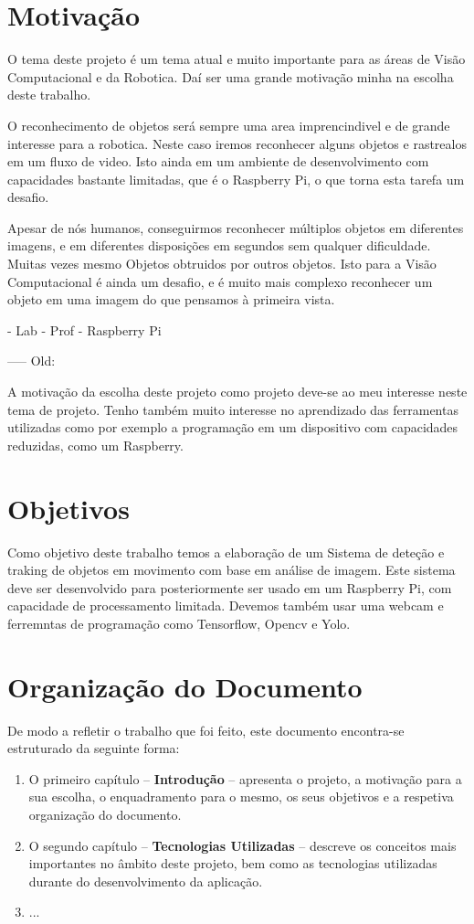 \section{Motivação}
\label{sec:mot}

O tema deste projeto é um tema atual e muito importante para as áreas de Visão Computacional e da Robotica. Daí ser uma grande motivação minha na escolha deste trabalho.

O reconhecimento de objetos será sempre uma area imprencindivel e de grande interesse para a robotica. Neste caso iremos reconhecer alguns objetos e rastrealos em um fluxo de video. 
Isto ainda em um ambiente de desenvolvimento com capacidades bastante limitadas, que é o Raspberry Pi, o que torna esta tarefa um desafio. 

Apesar de nós humanos, conseguirmos reconhecer múltiplos objetos em diferentes imagens, e em diferentes disposições em segundos sem qualquer dificuldade. Muitas vezes mesmo Objetos obtruidos por outros objetos. Isto para a Visão Computacional é ainda um desafio, e é muito mais complexo reconhecer um objeto em uma imagem do que pensamos à primeira vista.

- Lab 
- Prof
- Raspberry Pi

----- Old:

A motivação da escolha deste projeto como projeto deve-se ao meu interesse neste tema de projeto. Tenho também muito interesse no aprendizado das ferramentas utilizadas como por exemplo a programação em um dispositivo com capacidades reduzidas, como um Raspberry.


\section{Objetivos}
\label{sec:obj}

Como objetivo deste trabalho temos a elaboração de um Sistema de deteção e traking de objetos em movimento com base em análise de imagem. Este sistema deve ser desenvolvido para posteriormente ser usado em um Raspberry Pi, com capacidade de processamento limitada. Devemos também usar uma webcam e ferremntas de programação como Tensorflow, Opencv e Yolo.

\section{Organização do Documento}
\label{sec:organ}
De modo a refletir o trabalho que foi feito, este documento encontra-se estruturado da seguinte forma:
\begin{enumerate}
\item O primeiro capítulo -- \textbf{Introdução} -- apresenta o projeto, a motivação para a sua escolha, o enquadramento para o mesmo, os seus objetivos e a respetiva organização do documento.
\item O segundo capítulo -- \textbf{Tecnologias Utilizadas} -- descreve os conceitos mais importantes no âmbito deste projeto, bem como as tecnologias utilizadas durante do desenvolvimento da aplicação.
\item ...
\end{enumerate}

